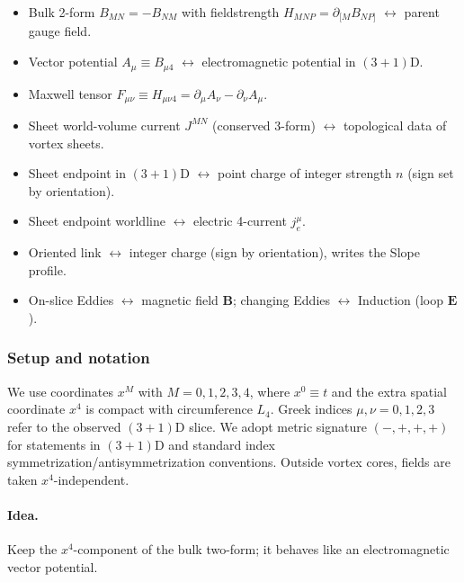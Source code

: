 \begin{tcolorbox}[title=Quick dictionary (objects \(\leftrightarrow\) meanings)]
\begin{itemize}
  \item Bulk 2-form \(B_{MN}=-B_{NM}\) with fieldstrength \(H_{MNP}=\partial_{[M}B_{NP]}\) $\leftrightarrow$ parent gauge field.
  \item Vector potential \(A_\mu\equiv B_{\mu 4}\) $\leftrightarrow$ electromagnetic potential in $(3{+}1)$D.
  \item Maxwell tensor \(F_{\mu\nu}\equiv H_{\mu\nu 4}=\partial_\mu A_\nu-\partial_\nu A_\mu\).
  \item Sheet world-volume current \(J^{MN}\) (conserved 3-form) $\leftrightarrow$ topological data of vortex sheets.
  \item Sheet endpoint in $(3{+}1)$D $\leftrightarrow$ point charge of integer strength \(n\) (sign set by orientation).
  \item Sheet endpoint worldline $\leftrightarrow$ electric 4-current \(j_e^\mu\).
  \item Oriented link $\leftrightarrow$ integer charge (sign by orientation), writes the Slope profile.
  \item On-slice Eddies $\leftrightarrow$ magnetic field $\mathbf B$; changing Eddies $\leftrightarrow$ Induction (loop $\mathbf E$).
\end{itemize}
\end{tcolorbox}

\subsubsection{Setup and notation}
We use coordinates $x^M$ with $M=0,1,2,3,4$, where $x^0\equiv t$ and the extra spatial coordinate $x^4$ is compact with circumference $L_4$. Greek indices $\mu,\nu=0,1,2,3$ refer to the observed $(3{+}1)$D slice. We adopt metric signature $(-,+,+,+)$ for statements in $(3{+}1)$D and standard index symmetrization/antisymmetrization conventions. Outside vortex cores, fields are taken $x^4$-independent.

\paragraph*{Idea.} Keep the $x^4$-component of the bulk two-form; it behaves like an electromagnetic vector potential.
